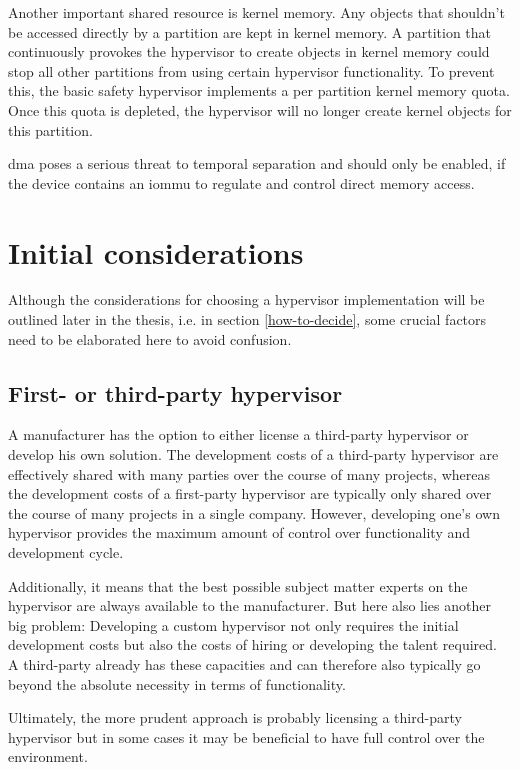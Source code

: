 Another important shared resource is kernel memory. Any objects that shouldn't be accessed directly by a partition are kept in kernel memory. A partition that continuously provokes the hypervisor to create objects in kernel memory could stop all other partitions from using certain hypervisor functionality. To prevent this, the basic safety hypervisor implements a per partition kernel memory quota. Once this quota is depleted, the hypervisor will no longer create kernel objects for this partition.

\acrshort{dma} poses a serious threat to temporal separation and should only be enabled, if the device contains an \acrshort{iommu} to regulate and control direct memory access.

\section{Initial considerations}
Although the considerations for choosing a hypervisor implementation will be outlined later in the thesis, i.e. in section \ref{how-to-decide}, some crucial factors need to be elaborated here to avoid confusion.
\subsection{First- or third-party hypervisor}
A manufacturer has the option to either license a third-party hypervisor or develop his own solution. The development costs of a third-party hypervisor are effectively shared with many parties over the course of many projects, whereas the development costs of a first-party hypervisor are typically only shared over the course of many projects in a single company. However, developing one's own hypervisor provides the maximum amount of control over functionality and development cycle.

Additionally, it means that the best possible subject matter experts on the hypervisor are always available to the manufacturer. But here also lies another big problem: Developing a custom hypervisor not only requires the initial development costs but also the costs of hiring or developing the talent required. A third-party already has these capacities and can therefore also typically go beyond the absolute necessity in terms of functionality.

Ultimately, the more prudent approach is probably licensing a third-party hypervisor but in some cases it may be beneficial to have full control over the environment. 

